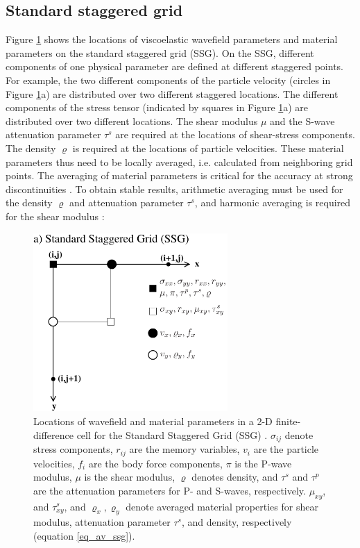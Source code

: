 \documentclass[11pt,onecolumn,oneside]{article}
\begin{document}
 \subsection{Standard staggered grid}
 \label{ssg}
Figure \ref{fig_cell} shows the locations of viscoelastic wavefield parameters and material parameters on the standard staggered grid (SSG). 
On the SSG, different components of one physical parameter are defined at different staggered points. For example, the two different components of the particle velocity (circles in Figure \ref{fig_cell}a) are distributed over two different staggered locations. The different components of the stress tensor (indicated by squares in Figure \ref{fig_cell}a) are distributed over two different locations. The shear modulus $\mu$ and the S-wave attenuation parameter $\tau^s$ \cite{blanch:95,bohlen:02} are required at the locations of shear-stress components. The density $\varrho$ is required
at the locations of particle velocities. These material parameters thus need to be locally averaged, i.e. calculated from neighboring grid points. The averaging of material parameters is critical
for the accuracy at strong discontinuities \cite{zahradnik:93,falk:98,moczo:02}. To obtain stable results, arithmetic averaging  must be used for the density $\varrho$ and attenuation parameter $\tau^s$, and harmonic averaging is required for the shear modulus \cite{fellinger:95,graves:96,falk:98,vossen:02,moczo:02}:

\begin{figure}[tb]
\begin{center}
\includegraphics[width=7.4cm,angle=0]{figures/cells_2D_ssg.pdf}
\end{center}
\caption{Locations of wavefield and material parameters in a 2-D finite-difference cell for the Standard Staggered Grid (SSG) \protect\cite{virieux:86,levander:88,robertsson:94}. $\sigma_{ij}$ denote stress components, $r_{ij}$ are the memory variables, $v_i$ are the particle velocities, $f_i$ are the body force components, $\pi$ is the P-wave modulus, $\mu$ is the shear modulus, $\varrho$ denotes density, and $\tau^s$ and $\tau^p$ are the attenuation parameters for P- and S-waves, respectively. $\mu_{xy}$, and $\tau^s_{xy}$,
and $\varrho_x, \varrho_y$ denote averaged material properties for shear modulus, attenuation parameter $\tau^s$, and density, respectively (equation \protect\ref{eq_av_ssg}).}
\label{fig_cell}
\end{figure}
\end{document}
